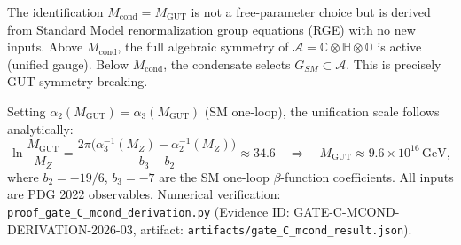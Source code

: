 The identification $M_{\mathrm{cond}} = M_{\mathrm{GUT}}$ is not a free-parameter choice but is derived from Standard Model renormalization group equations (RGE) with no new inputs. Above $M_{\mathrm{cond}}$, the full algebraic symmetry of $\mathcal{A} = \mathbb{C}\otimes\mathbb{H}\otimes\mathbb{O}$ is active (unified gauge). Below $M_{\mathrm{cond}}$, the condensate selects $G_{SM} \subset \mathcal{A}$. This is precisely GUT symmetry breaking.

Setting $\alpha_2(M_{\mathrm{GUT}}) = \alpha_3(M_{\mathrm{GUT}})$ (SM one-loop), the unification scale follows analytically:
\begin{equation}
    \ln\!\frac{M_{\mathrm{GUT}}}{M_Z} = \frac{2\pi\bigl(\alpha_3^{-1}(M_Z) - \alpha_2^{-1}(M_Z)\bigr)}{b_3 - b_2}
    \approx 34.6
    \quad \Longrightarrow \quad M_{\mathrm{GUT}} \approx 9.6\times 10^{16}\,\mathrm{GeV},
\end{equation}
where $b_2 = -19/6$, $b_3 = -7$ are the SM one-loop $\beta$-function coefficients. All inputs are PDG 2022 observables. Numerical verification: \texttt{proof\_\allowbreak gate\_\allowbreak C\_\allowbreak mcond\_\allowbreak derivation.py} (Evidence ID: GATE-C-MCOND-DERIVATION-2026-03, artifact: \texttt{artifacts/\allowbreak gate\_\allowbreak C\_\allowbreak mcond\_\allowbreak result.json}).

